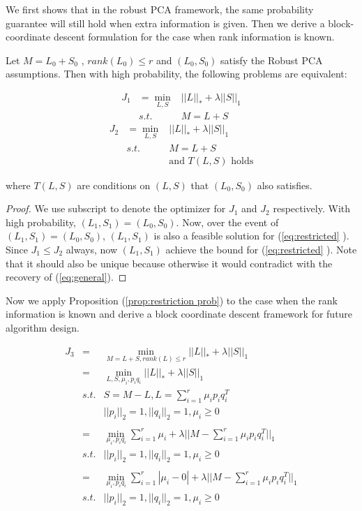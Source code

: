 We first shows that in the robust PCA framework, the same probability
guarantee will still hold when extra information is given. Then we
derive a block-coordinate descent formulation for the case when rank
information is known.
\begin{prop}
\label{prop:restriction prob}Let $M=L_{0}+S_{0}$ , $rank(L_{0})\le r$ and $(L_0,S_0)$
satisfy the Robust PCA assumptions. Then with high probability, the
following problems are equivalent:

\begin{eqnarray}
J_{1} & =\min_{L,S} & ||L||_{*}+\lambda||S||_{1}\label{eq:general}\\
 & s.t. & M=L+S\nonumber
\end{eqnarray}
\begin{eqnarray}
J_{2} & =\min_{L,S} & ||L||_{*}+\lambda||S||_{1}\label{eq:restricted}\\
 & s.t. & M=L+S\nonumber \\
 &  & \text{and }T(L,S)\text{ holds}\nonumber
\end{eqnarray}


where $T(L,S)$ are conditions on $(L,S)$ that $(L_{0},S_{0})$ also
satisfies.\end{prop}
\begin{proof}
We use subscript to denote the optimizer for $J_{1}$ and $J_{2}$ respectively.
With high probability, $(L_{1},S_{1})=(L_{0},S_{0})$. Now, over the
event of $(L_{1},S_{1})=(L_{0},S_{0})$, $(L_{1},S_{1})$ is also
a feasible solution for (\ref{eq:restricted} ). Since $J_{1}\le J_{2}$ always,
now $(L_{1},S_{1})$ achieve the bound for (\ref{eq:restricted} ).
Note that it should also be unique because otherwise it would contradict with
the recovery of (\ref{eq:general}).
\end{proof}
Now we apply Proposition (\ref{prop:restriction prob}) to the case
when the rank information is known and derive a block coordinate descent
framework for future algorithm design.

\begin{eqnarray}
J_{3} & = & \min_{M=L+S,rank(L)\le r}||L||_{*}+\lambda||S||_{1}\nonumber \\
 & = & \min_{L,S,\mu_{i},p_{i}q_{i}}||L||_{*}+\lambda||S||_{1}\nonumber \\
 & s.t. & S=M-L,L=\sum_{i=1}^{r}\mu_{i}p_{i}q_{i}^{T}\nonumber \\
 &  & ||p_{i}||_{2}=1,||q_{i}||_{2}=1,\mu_{i}\ge0\nonumber \\
\nonumber \\
 & = & \min_{\mu_{i},p_{i}q_{i}}\sum_{i=1}^{r}\mu_{i}+\lambda||M-\sum_{i=1}^{r}\mu_{i}p_{i}q_{i}^{T}||_{1}\nonumber \\
 & s.t. & ||p_{i}||_{2}=1,||q_{i}||_{2}=1,\mu_{i}\ge0\nonumber \\
\nonumber \\
 & = & \min_{\mu_{i},p_{i}q_{i}}\sum_{i=1}^{r}|\mu_{i}-0|+\lambda||M-\sum_{i=1}^{r}\mu_{i}p_{i}q_{i}^{T}||_{1}\label{eq:rank form}\\
 & s.t. & ||p_{i}||_{2}=1,||q_{i}||_{2}=1,\mu_{i}\ge0\nonumber
\end{eqnarray}


